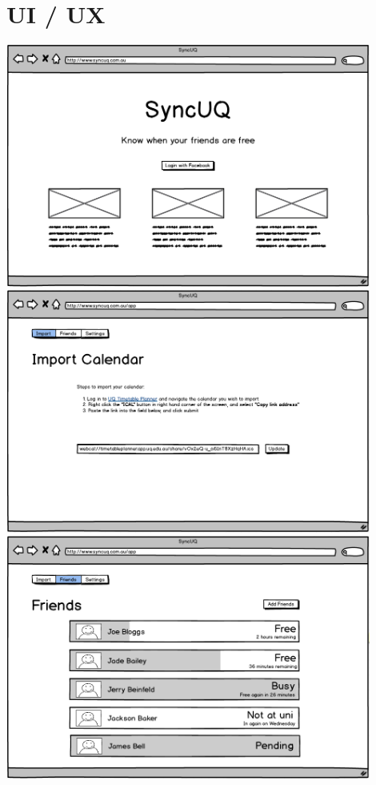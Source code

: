 \documentclass[11pt,a4paper]{report}
\begin{document}
\section{UI / UX}

\centering
\includegraphics[width=0.9\textwidth]{Homepage.png}
\medskip
\centering
\medskip
\includegraphics[width=0.9\textwidth]{Import.png}
\medskip
\centering
\includegraphics[width=0.9\textwidth]{Friends.png}
\end{document}
